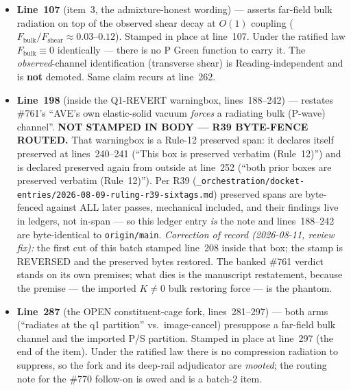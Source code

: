 \begin{itemize}
  \item \textbf{Line~107} (item~3, the admixture-honest wording) --- asserts far-field bulk radiation on top of the observed shear decay at $O(1)$ coupling ($F_{\mathrm{bulk}}/F_{\mathrm{shear}} \approx 0.03$--$0.12$). Stamped in place at line~107. Under the ratified law $F_{\mathrm{bulk}} \equiv 0$ identically --- there is no P Green function to carry it. The \emph{observed}-channel identification (transverse shear) is Reading-independent and is \textbf{not} demoted. Same claim recurs at line~262.
  \item \textbf{Line~198} (inside the Q1-REVERT warningbox, lines~188--242) --- restates \#761's ``AVE's own elastic-solid vacuum \emph{forces} a radiating bulk (P-wave) channel''. \textbf{NOT STAMPED IN BODY --- R39 BYTE-FENCE ROUTED.} That warningbox is a Rule-12 preserved span: it declares itself preserved at lines~240--241 (``This box is preserved verbatim (Rule~12)'') and is declared preserved again from outside at line~252 (``both prior boxes are preserved verbatim (Rule~12)''). Per R39 (\texttt{\_orchestration/docket-entries/2026-08-09-ruling-r39-sixtags.md}) preserved spans are byte-fenced against ALL later passes, mechanical included, and their findings live in ledgers, not in-span --- so this ledger entry \emph{is} the note and lines~188--242 are byte-identical to \texttt{origin/main}. \emph{Correction of record (2026-08-11, review fix):} the first cut of this batch stamped line~208 inside that box; the stamp is REVERSED and the preserved bytes restored. The banked \#761 verdict stands on its own premises; what dies is the manuscript restatement, because the premise --- the imported $K \neq 0$ bulk restoring force --- is the phantom.
  \item \textbf{Line~287} (the OPEN constituent-cage fork, lines~281--297) --- both arms (``radiates at the q1 partition'' vs.\ image-cancel) presuppose a far-field bulk channel and the imported P/S partition. Stamped in place at line~297 (the end of the item). Under the ratified law there is no compression radiation to suppress, so the fork and its deep-rail adjudicator are \emph{mooted}; the routing note for the \#770 follow-on is owed and is a batch-2 item.
\end{itemize}

